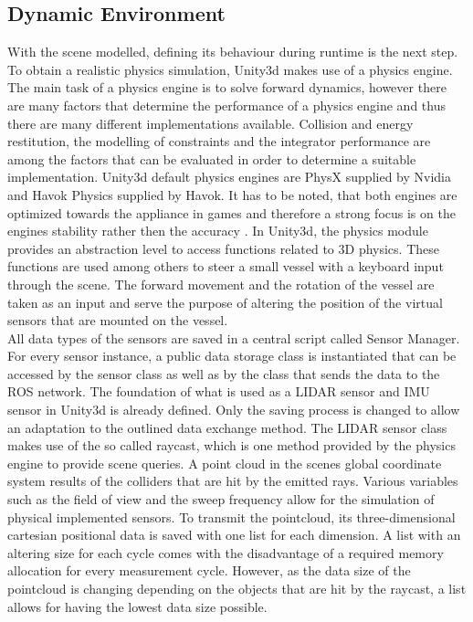 \subsection{Dynamic Environment} \label{VirtEnvDyn}

With the scene modelled, defining its behaviour during runtime is the next step. To obtain a realistic physics simulation, Unity3d makes use of a physics engine. The main task of a physics engine is to solve forward dynamics, however there are many factors that determine the performance of a physics engine and thus there are many different implementations available. Collision and energy restitution, the modelling of constraints and the integrator performance are among the factors that can be evaluated in order to determine a suitable implementation. Unity3d default physics engines are PhysX supplied by Nvidia and Havok Physics supplied by Havok. It has to be noted, that both engines are optimized towards the appliance in games and therefore a strong focus is on the engines stability rather then the accuracy \cite{PhysXComp}. In Unity3d, the physics module provides an abstraction level to access functions related to 3D physics. These functions are used among others to steer a small vessel with a keyboard input through the scene. The forward movement and the rotation of the vessel are taken as an input and serve the purpose of altering the position of the virtual sensors that are mounted on the vessel.\\

All data types of the sensors are saved in a central script called Sensor Manager. For every sensor instance, a public data storage class is instantiated that can be accessed by the sensor class as well as by the class that sends the data to the \ac{ROS} network. The foundation of what is used as a \ac{LIDAR} sensor and \ac{IMU} sensor in Unity3d is already defined. Only the saving process is changed to allow an adaptation to the outlined data exchange method. The \ac{LIDAR} sensor class makes use of the so called raycast, which is one method provided by the physics engine to provide scene queries. A point cloud in the scenes global coordinate system results of the colliders that are hit by the emitted rays. Various variables such as the field of view and the sweep frequency allow for the simulation of physical implemented sensors. To transmit the pointcloud, its three-dimensional cartesian positional data is saved with one list for each dimension. A list with an altering size for each cycle comes with the disadvantage of a required memory allocation for every measurement cycle. However, as the data size of the pointcloud is changing depending on the objects that are hit by the raycast, a list allows for having the lowest data size possible.\\

